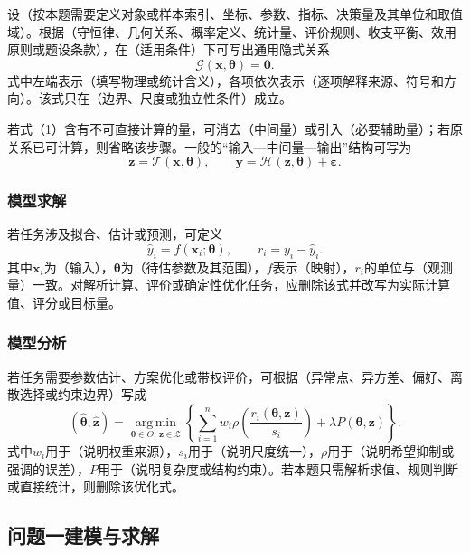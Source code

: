\documentclass[UTF8,zihao=-4]{ctexart}
\newcommand{\fillin}[1]{（#1）}
\begin{document}
设\fillin{按本题需要定义对象或样本索引、坐标、参数、指标、决策量及其单位和取值域}。根据\fillin{守恒律、几何关系、概率定义、统计量、评价规则、收支平衡、效用原则或题设条款}，在\fillin{适用条件}下可写出通用隐式关系
\begin{equation}
  \mathcal G\!\left(\bm x,\bm\theta\right)=\bm 0.
\end{equation}
式中左端表示\fillin{填写物理或统计含义}，各项依次表示\fillin{逐项解释来源、符号和方向}。该式只在\fillin{边界、尺度或独立性条件}成立。

若式（1）含有不可直接计算的量，可消去\fillin{中间量}或引入\fillin{必要辅助量}；若原关系已可计算，则省略该步骤。一般的“输入—中间量—输出”结构可写为
\begin{equation}
  \bm z=\mathcal T(\bm x,\bm\theta),\qquad
  \bm y=\mathcal H(\bm z,\bm\theta)+\bm\varepsilon.
\end{equation}

\subsubsection{模型求解}

若任务涉及拟合、估计或预测，可定义
\begin{equation}
  \widehat y_i=f(\bm x_i;\bm\theta),\qquad
  r_i=y_i-\widehat y_i.
\end{equation}
其中$\bm x_i$为\fillin{输入}，$\bm\theta$为\fillin{待估参数及其范围}，$f$表示\fillin{映射}，$r_i$的单位与\fillin{观测量}一致。对解析计算、评价或确定性优化任务，应删除该式并改写为实际计算值、评分或目标量。

\subsubsection{模型分析}

若任务需要参数估计、方案优化或带权评价，可根据\fillin{异常点、异方差、偏好、离散选择或约束边界}写成
\begin{equation}
  (\widehat{\bm\theta},\widehat{\bm z})
  =\underset{\bm\theta\in\Theta,\,\bm z\in\mathcal Z}{\operatorname{arg\,min}}
  \left\{
  \sum_{i=1}^{n}w_i\rho\!\left(
  \frac{r_i(\bm\theta,\bm z)}{s_i}
  \right)+\lambda P(\bm\theta,\bm z)
  \right\}.
\end{equation}
式中$w_i$用于\fillin{说明权重来源}，$s_i$用于\fillin{说明尺度统一}，$\rho$用于\fillin{说明希望抑制或强调的误差}，$P$用于\fillin{说明复杂度或结构约束}。若本题只需解析求值、规则判断或直接统计，则删除该优化式。

\subsection{问题一建模与求解}
\end{document}
